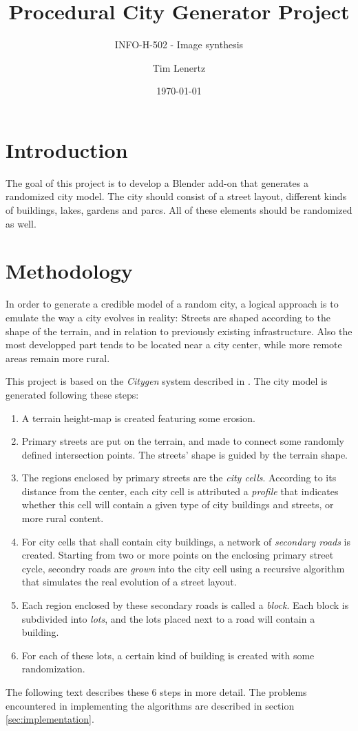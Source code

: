 \documentclass[a4paper,12pt]{scrartcl}
\begin{document}
\titlehead{Université Libre de Bruxelles}
\title{Procedural City Generator Project}
\subtitle{INFO-H-502 - Image synthesis}
\author{Tim Lenertz}
\date{\today}
\maketitle

\section{Introduction}
The goal of this project is to develop a Blender add-on that generates a randomized city model. The city should consist of a street layout, different kinds of buildings, lakes, gardens and parcs. All of these elements should be randomized as well.

\section{Methodology}
In order to generate a credible model of a random city, a logical approach is to emulate the way a city evolves in reality: Streets are shaped according to the shape of the terrain, and in relation to previously existing infrastructure. Also the most developped part tends to be located near a city center, while more remote areas remain more rural.

This project is based on the \emph{Citygen} system described in \cite{Kell2007}. The city model is generated following these steps:
\begin{enumerate}
\item A terrain height-map is created featuring some erosion.
\item Primary streets are put on the terrain, and made to connect some randomly defined intersection points. The streets' shape is guided by the terrain shape.
\item The regions enclosed by primary streets are the \emph{city cells}. According to its distance from the center, each city cell is attributed a \emph{profile} that indicates whether this cell will contain a given type of city buildings and streets, or more rural content.
\item For city cells that shall contain city buildings, a network of \emph{secondary roads} is created. Starting from two or more points on the enclosing primary street cycle, secondry roads are \emph{grown} into the city cell using a recursive algorithm that simulates the real evolution of a street layout.
\item Each region enclosed by these secondary roads is called a \emph{block}. Each block is subdivided into \emph{lots}, and the lots placed next to a road will contain a building.
\item For each of these lots, a certain kind of building is created with some randomization.
\end{enumerate}
The following text describes these 6 steps in more detail. The problems encountered in implementing the algorithms are described in section \ref{sec:implementation}.
\end{document}
